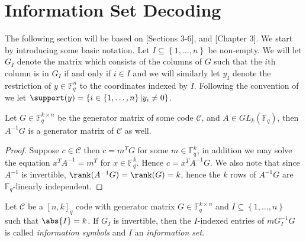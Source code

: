 \section{Information Set Decoding}\label{sec:information_set_decoding}
The following section will be based on \cite{information_set_decoding}[Sections 3-6], \cite{lee_brickell} and \cite{notes_on_code_based_cryptography}[Chapter 3]. We start by introducing some basic notation. Let $I \subseteq \left\{1, \ldots, n\right\}$ be non-empty. We will let $G_I$ denote the matrix which consists of the columns of $G$ such that the $i$th column is in $G_I$ if and only if $i \in I$ and we will similarly let $y_I$ denote the restriction of $y \in \mathbb{F}_q^n$ to the coordinates indexed by $I$. Following the convention of \cite{notes_on_code_based_cryptography} we let $\support(y) = \left\{i \in \left\{1, \ldots, n\right\} | y_i \neq 0 \right\}$.

\begin{proposition}\label{prop:multiplying_by_information_matrix_generates_the_same_code}
  Let $G \in \mathbb{F}_q^{k \times n}$ be the generator matrix of some code $\mathcal{C}$, and $A \in GL_k(\mathbb{F}_q)$, then $A^{-1}G$ is a generator matrix of $\mathcal{C}$ as well.
\end{proposition}
\begin{proof}
  Suppose $c \in \mathcal{C}$ then $c = m^TG$ for some $m \in \mathbb{F}_q^{k}$, in addition we may solve the equation $x^TA^{-1} = m^{T}$ for $x \in \mathbb{F}^k_q$. Hence $c = x^TA^{-1}G$. We also note that since $A^{-1}$ is invertible, $\rank(A^{-1}G) = \rank(G) = k$, hence the $k$ rows of $A^{-1}G$ are $\mathbb{F}_q$-linearly independent.
\end{proof}

\begin{definition}
  Let $\mathcal{C}$ be a $[n, k]_q$ code with generator matrix $G \in \mathbb{F}_q^{k \times n}$ and $I \subseteq \left\{1, \ldots, n\right\}$ such that $\abs{I} = k$. If $G_I$ is invertible, then the $I$-indexed entries of $mG^{-1}_I G$ is called \textit{information symbols} and $I$ an \textit{information set}.
\end{definition}

